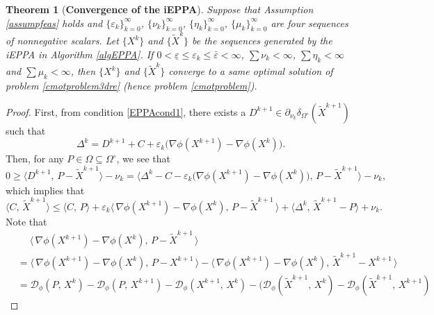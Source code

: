 \documentclass[10pt]{article}
\newtheorem{theorem}{Theorem}
\begin{document}
\begin{theorem}[\textbf{Convergence of the iEPPA}]\label{thmconverEPPA}
Suppose that Assumption \ref{assumpfeas} holds and $\{\varepsilon_k\}_{k=0}^{\infty}$, $\{\nu_k\}_{k=0}^{\infty}$, $\{\eta_k\}_{k=0}^{\infty}$, $\{\mu_k\}_{k=0}^{\infty}$ are four sequences of nonnegative scalars. Let $\{X^{k}\}$ and $\{\widetilde{X}^{k}\}$ be the sequences generated by the iEPPA in Algorithm \ref{algEPPA}. If $0<\underline{\varepsilon}\leq\varepsilon_k\leq\bar{\varepsilon}<\infty$, $\sum\nu_k<\infty$, $\sum\eta_k<\infty$ and $\sum\mu_k<\infty$, then $\{X^{k}\}$ and $\{\widetilde{X}^{k}\}$ converge to a same optimal solution of problem \eqref{cmotproblem3dre} (hence problem \eqref{cmotproblem}).
\end{theorem}
\begin{proof}
First, from condition \eqref{EPPAcond1}, there exists a $D^{k+1}\in\partial_{\nu_k} \delta_{\Omega^{\circ}}(\widetilde{X}^{k+1})$ such that
\begin{equation*}
\Delta^{k} = D^{k+1} + C + \varepsilon_k\big(\nabla\phi(X^{k+1}) - \nabla\phi(X^{k})\big).
\end{equation*}
Then, for any $P\in\Omega\subseteq\Omega^{\circ}$, we see that
\begin{equation*}
0 \geq \langle D^{k+1}, \,P-\widetilde{X}^{k+1} \rangle - \nu_k
= \langle \Delta^{k} - C - \varepsilon_k\big(\nabla\phi(X^{k+1}) - \nabla\phi(X^{k})\big), \,P-\widetilde{X}^{k+1} \rangle - \nu_k,
\end{equation*}
which implies that
\begin{equation}\label{ineq1}
\langle C, \,\widetilde{X}^{k+1}\rangle \leq \langle C, \,P\rangle + \varepsilon_k\langle \,\nabla\phi(X^{k+1}) - \nabla\phi(X^{k}), \,P-\widetilde{X}^{k+1} \,\rangle + \langle \Delta^{k}, \,\widetilde{X}^{k+1}-P \rangle + \nu_k.
\end{equation}
Note that
\begin{equation}\label{ineq2}
\begin{aligned}
&\quad \;\langle \,\nabla\phi(X^{k+1}) - \nabla\phi(X^{k}), \,P-\widetilde{X}^{k+1} \,\rangle \\
&=\langle\,\nabla\phi(X^{k+1}) - \nabla\phi(X^{k}), \,P-X^{k+1} \,\rangle-\langle \,\nabla\phi(X^{k+1}) - \nabla\phi(X^{k}), \,\widetilde{X}^{k+1}-X^{k+1} \,\rangle \\
&=\mathcal{D}_{\phi}(P,\,X^k)-\mathcal{D}_{\phi}(P,\,X^{k+1})
-\mathcal{D}_{\phi}(X^{k+1},\,X^k)
-\big( \mathcal{D}_{\phi}(\widetilde{X}^{k+1},\,X^k)
-\mathcal{D}_{\phi}(\widetilde{X}^{k+1},\,X^{k+1})

\end{aligned}
\end{equation}
\end{proof}
\end{document}
